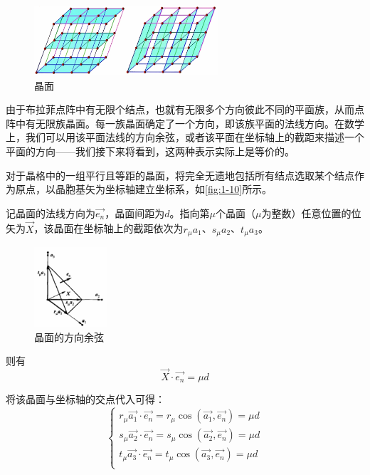     \begin{figure}[!htbp]
        \centering    
        \includegraphics[height=7em, keepaspectratio=true]{pic/1-33}
        \caption{晶面}
        \label{fig:1-09}
    \end{figure}

    由于布拉菲点阵中有无限个结点，也就有无限多个方向彼此不同的平面族，从而点阵中有无限族晶面。每一族晶面确定了一个方向，即该族平面的法线方向。在数学上，我们可以用该平面法线的方向余弦，或者该平面在坐标轴上的截距来描述一个平面的方向——我们接下来将看到，这两种表示实际上是等价的。

    对于晶格中的一组平行且等距的晶面，将完全无遗地包括所有结点选取某个结点作为原点，以晶胞基矢为坐标轴建立坐标系，如\autoref{fig:1-10}所示。
    
    记晶面的法线方向为$\vec{e_n}$，晶面间距为$d$。指向第$\mu$个晶面（$\mu$为整数）任意位置的位矢为$\vec{X}$，该晶面在坐标轴上的截距依次为$r_\mu a_1$、$s_\mu a_2$、$t_\mu a_3$。

    \begin{figure}[!htbp]
        \centering    
        \includegraphics[height=8em, keepaspectratio=true]{pic/1-34}
        \caption{晶面的方向余弦}
        \label{fig:1-10}
    \end{figure}

    则有
    \[
        \vec{X} \cdot \vec{e_n} = \mu d
    \]
    
    将该晶面与坐标轴的交点代入可得：
    \[
    \begin{cases}
        r_\mu \vec{a_1} \cdot \vec{e_n} = r_\mu \cos (\vec{a_1}, \vec{e_n}) = \mu d \\
        s_\mu \vec{a_2} \cdot \vec{e_n} = s_\mu \cos (\vec{a_2}, \vec{e_n}) = \mu d \\
        t_\mu \vec{a_3} \cdot \vec{e_n} = t_\mu \cos (\vec{a_3}, \vec{e_n}) = \mu d \\
    \end{cases}
    \]

